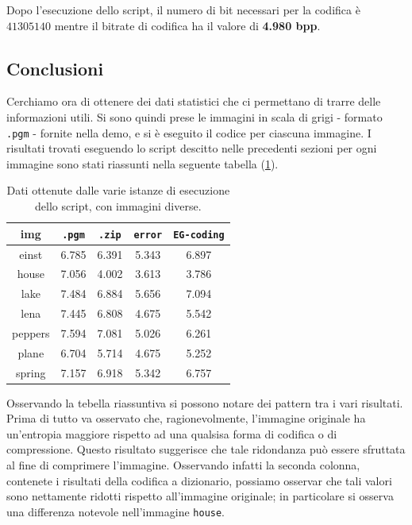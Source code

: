 \noindent Dopo l'esecuzione dello script, il numero di bit necessari per la codifica è $41305140$ mentre il bitrate di codifica ha il valore di \textbf{4.980 bpp}.


\subsection{Conclusioni}
Cerchiamo ora di ottenere dei dati statistici che ci permettano di trarre delle informazioni utili. Si sono quindi prese le immagini in scala di grigi - formato \texttt{.pgm} - fornite nella demo, e si è eseguito il codice per ciascuna immagine. I risultati trovati eseguendo lo script descitto nelle precedenti sezioni per ogni immagine sono stati riassunti nella seguente tabella (\ref{tab:simple-conclusions}).


\begin{table}[h]
    \centering
    \renewcommand{\arraystretch}{1.5}
    \begin{tabular}{| c | c c c c |}
        \hline
        \textbf{img} & \texttt{.pgm} & \texttt{.zip} & \texttt{error} & \texttt{EG-coding} \\ \hline \hline

        einst & 6.785  & 6.391 & 5.343 & 6.897 \\

        house & 7.056  & 4.002 & 3.613 & 3.786 \\

        lake & 7.484  & 6.884 & 5.656 & 7.094 \\

        lena & 7.445  & 6.808 & 4.675 & 5.542 \\

        peppers & 7.594  & 7.081 & 5.026 & 6.261 \\

        plane & 6.704  & 5.714 & 4.675 & 5.252 \\

        spring & 7.157 & 6.918 & 5.342 & 6.757 \\
        \hline
    \end{tabular}
    \caption{Dati ottenute dalle varie istanze di esecuzione dello script, con immagini diverse.}
    \label{tab:simple-conclusions}
    \renewcommand{\arraystretch}{1}
\end{table}

\noindent Osservando la tebella riassuntiva si possono notare dei pattern tra i vari risultati. Prima di tutto va osservato che, ragionevolmente, l'immagine originale ha un'entropia maggiore rispetto ad una qualsisa forma di codifica o di compressione. Questo risultato suggerisce che tale ridondanza può essere sfruttata al fine di comprimere l'immagine. Osservando infatti la seconda colonna, contenete i risultati della codifica a dizionario, possiamo osservar che tali valori sono nettamente ridotti rispetto all'immagine originale; in particolare si osserva una differenza notevole nell'immagine \texttt{house}. 

